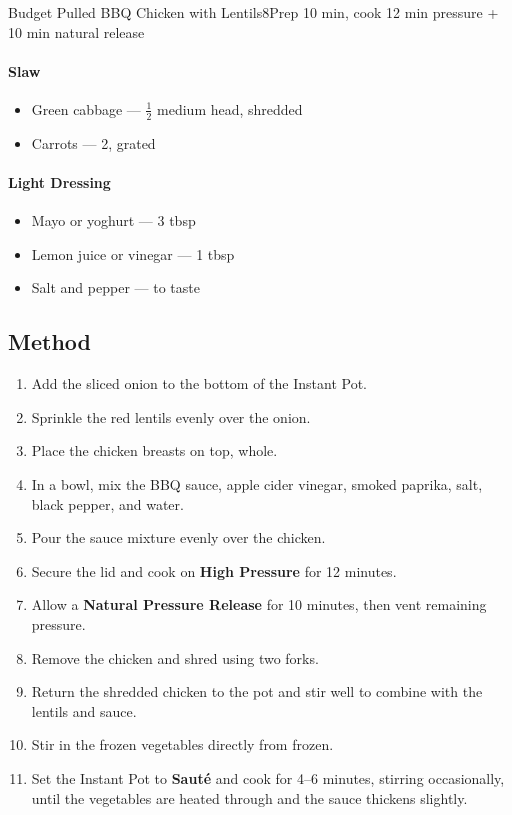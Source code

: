 \begin{recipebox}{Budget Pulled BBQ Chicken with Lentils}{8}{Prep 10 min, cook 12 min pressure + 10 min natural release}
\paragraph{Slaw}
\begin{itemize}
    \item Green cabbage — $\tfrac{1}{2}$ medium head, shredded
    \item Carrots — 2, grated
\end{itemize}

\paragraph{Light Dressing}
\begin{itemize}
    \item Mayo or yoghurt — 3 tbsp
    \item Lemon juice or vinegar — 1 tbsp
    \item Salt and pepper — to taste
\end{itemize}

\subsection*{Method}
\begin{enumerate}
    \item Add the sliced onion to the bottom of the Instant Pot.
    \item Sprinkle the red lentils evenly over the onion.
    \item Place the chicken breasts on top, whole.
    \item In a bowl, mix the BBQ sauce, apple cider vinegar, smoked paprika, salt, black pepper, and water.
    \item Pour the sauce mixture evenly over the chicken.
    \item Secure the lid and cook on \textbf{High Pressure} for 12 minutes.
    \item Allow a \textbf{Natural Pressure Release} for 10 minutes, then vent remaining pressure.
    \item Remove the chicken and shred using two forks.
    \item Return the shredded chicken to the pot and stir well to combine with the lentils and sauce.
    \item Stir in the frozen vegetables directly from frozen.
    \item Set the Instant Pot to \textbf{Sauté} and cook for 4--6 minutes, stirring occasionally, until the vegetables are heated through and the sauce thickens slightly.
\end{enumerate}


\end{recipebox}
